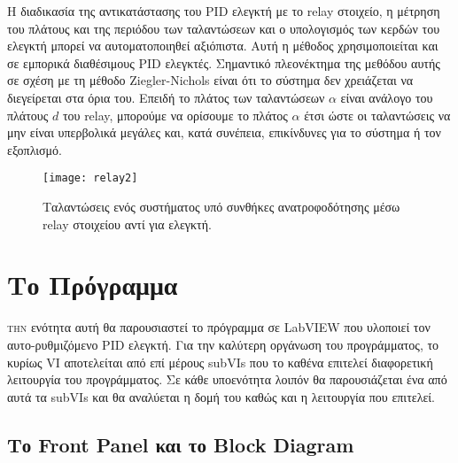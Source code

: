 Η διαδικασία της αντικατάστασης του PID ελεγκτή με το relay στοιχείο, η μέτρηση του πλάτους και της περιόδου των ταλαντώσεων και ο υπολογισμός των κερδών του ελεγκτή μπορεί να αυτοματοποιηθεί αξιόπιστα. Αυτή η μέθοδος χρησιμοποιείται και σε εμπορικά διαθέσιμους PID ελεγκτές. Σημαντικό πλεονέκτημα της μεθόδου αυτής σε σχέση με τη μέθοδο Ziegler-Nichols είναι ότι το σύστημα δεν χρειάζεται να διεγείρεται στα όρια του. Επειδή το πλάτος των ταλαντώσεων $\alpha$ είναι ανάλογο του πλάτους $d$ του relay, μπορούμε να ορίσουμε το πλάτος $\alpha$ έτσι ώστε οι ταλαντώσεις να μην είναι υπερβολικά μεγάλες και, κατά συνέπεια, επικίνδυνες για το σύστημα ή τον εξοπλισμό.

\begin{figure}[H]
  \centering
  \texttt{[image: relay2]}
  \caption{Ταλαντώσεις ενός συστήματος υπό συνθήκες ανατροφοδότησης μέσω relay στοιχείου αντί για ελεγκτή.}
  \label{fig:relay2}
\end{figure}

\section{Το Πρόγραμμα}

\lettrine[findent=2pt]{}{την} ενότητα αυτή θα παρουσιαστεί το πρόγραμμα σε LabVIEW που υλοποιεί τον αυτο-ρυθμιζόμενο PID ελεγκτή. Για την καλύτερη οργάνωση του προγράμματος, το κυρίως VI αποτελείται από επί μέρους subVIs που το καθένα επιτελεί διαφορετική λειτουργία του προγράμματος. Σε κάθε υποενότητα λοιπόν θα παρουσιάζεται ένα από αυτά τα subVIs και θα αναλύεται η δομή του καθώς και η λειτουργία που επιτελεί.

\subsection{Το Front Panel και το Block Diagram}





















